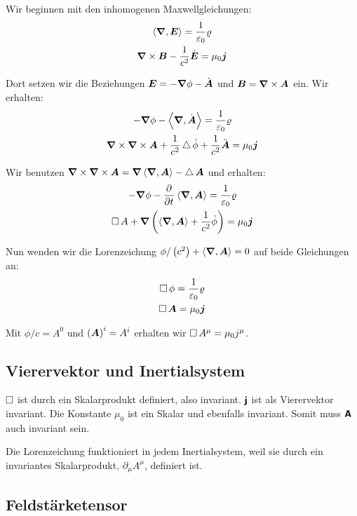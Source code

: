 Wir beginnen mit den inhomogenen Maxwellgleichungen:
\begin{gather*}
	\left\langle \boldsymbol{\nabla}, \boldsymbol{E} \right\rangle = \frac{1}{\varepsilon_0} \varrho \\
	\boldsymbol{\nabla} \times \boldsymbol{B} - \frac{1}{c^2} \dot{\boldsymbol{E}} = \mu_0 \boldsymbol{j}
\end{gather*}

Dort setzen wir die Beziehungen $\boldsymbol{E} = - \boldsymbol{\nabla} \phi - \dot{\boldsymbol{A}}$ und
$\boldsymbol{B} = \boldsymbol{\nabla} \times \boldsymbol{A}$ ein. Wir erhalten:
\begin{gather*}
	- \boldsymbol{\nabla} \phi - \left\langle \boldsymbol{\nabla}, \dot{\boldsymbol{A}} \right\rangle = \frac{1}{\varepsilon_0} \varrho \\
	\boldsymbol{\nabla} \times \boldsymbol{\nabla} \times \boldsymbol{A} + \frac 1{c^2} \operatorname{\bigtriangleup} \dot \phi + \frac 1{c^2} \ddot{\boldsymbol{A}} = \mu_0 \boldsymbol{j}
\end{gather*}

Wir benutzen $\boldsymbol{\nabla} \times \boldsymbol{\nabla} \times \boldsymbol{A} = \boldsymbol{\nabla} \left\langle \boldsymbol{\nabla}, \boldsymbol{A} \right\rangle - \operatorname{\bigtriangleup} \boldsymbol{A}$ und erhalten:
\begin{gather*}
	- \vnabla \phi - \dpd{}t \divergence{\vec A} = \frac{1}{\varepsilon_0} \varrho \\
	\dalambert A + \vnabla\del{\divergence{\vec A} + \frac 1{c^2} \dot \phi} = \mu_0 \vec j
\end{gather*}

Nun wenden wir die Lorenzeichung $\phi/\del{c^2} + \divergence{\vec A} = 0$ auf
beide Gleichungen an:
\begin{gather*}
	\operatorname{\Box} \phi = \frac{1}{\varepsilon_0} \varrho \\
	\operatorname{\Box} \boldsymbol{A} = \mu_0 \boldsymbol{j}
\end{gather*}

Mit $\phi/c = A^0$ und $\del{\vec A}^i = A^i$ erhalten wir $\operatorname{\Box} A^\mu =
\mu_0 j^\mu$.

\subsection{Vierervektor und Inertialsystem}

$\operatorname{\Box}$ ist durch ein Skalarprodukt definiert, also invariant. $\boldsymbol{\mathsf{j}}$
ist als Vierervektor invariant. Die Konstante $\mu_0$ ist ein Skalar und
ebenfalls invariant. Somit muss $\boldsymbol{\mathsf{A}}$ auch invariant sein.

Die Lorenzeichung funktioniert in jedem Inertialsystem, weil sie durch ein
invariantes Skalarprodukt, $\partial_\mu A^\mu$, definiert ist.

\subsection{Feldstärketensor}

